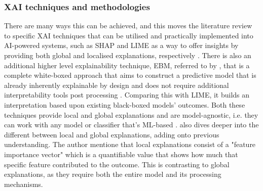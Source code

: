 
\subsubsection*{XAI techniques and methodologies}
There are many ways this can be achieved, and this moves the literature review to specific XAI techniques that can be utilised and practically implemented into AI-powered systems, such as SHAP and LIME as a way to offer insights \citep{shendkar2024enhancing} by providing both global and localised explanations, respectively \citep{palaniappan2020malicious}. There is also an additional higher level explainability technique, EBM, referred to by \cite{hernandes2021phishing}, that is a complete white-boxed approach that aims to construct a predictive model that is already inherently explainable by design and does not require additional interpretability tools post processing \citep{greco2023explaining}. Comparing this with LIME, it builds an interpretation based upon existing black-boxed models' outcomes. Both these techniques provide local and global explanations and are model-agnostic, i.e. they can work with any model or classifier that's ML-based \citep{anderson2015polymorphic}. \cite{greco2023explaining} also dives deeper into the different between local and global explanations, adding onto previous understanding. The author mentione that local explanations consist of a "feature importance vector" which is a quantifiable value that shows how much that specific feature contributed to the outcome. This is contrasting to global explanations, as they require both the entire model and its processing mechanisms.
